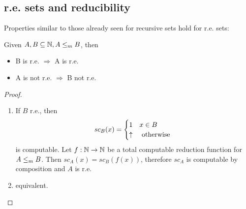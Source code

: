 \subsection{r.e. sets and reducibility}
Properties similar to those already seen for recursive sets hold for r.e. sets:
\begin{observation}
  Given $A,B \subseteq \mathbb{N}, A\leq_m B$, then
  \begin{itemize}
  \item B is r.e. $\Rightarrow$ A is r.e.
  \item A is not r.e. $\Rightarrow$ B not r.e.
  \end{itemize}
  \begin{proof}
    \begin{enumerate}
      \item If $B$ r.e., then
      \begin{equation*}
        sc_B(x) = \begin{cases}
          1 & x \in B \\
          \uparrow & $ otherwise $
        \end{cases}
      \end{equation*}
      is computable.  Let $f:\mathbb{N}\rightarrow\mathbb{N}$ be a total
      computable reduction function for $A\leq_m B$. Then
      $ sc_A(x) = sc_B(f(x)) $, therefore $ sc_A $ is computable by
      composition and $A$ is r.e.
      \item equivalent.
    \end{enumerate}
  \end{proof}
\end{observation}
